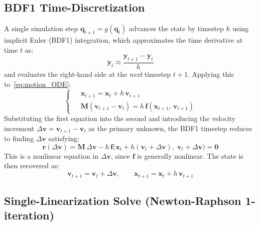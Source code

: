 \documentclass{article}
\begin{document}
\subsection{BDF1 Time-Discretization}

A single simulation step $\mathbf{q}_{t+1} = g(\mathbf{q}_t)$ advances the state by timestep $h$ using implicit Euler (BDF1) integration, which approximates the time derivative at time $t$ as:
\begin{equation*}
    \dot{\mathbf{y}}_t \approx \frac{\mathbf{y}_{t+1} - \mathbf{y}_t}{h}
\end{equation*}
and evaluates the right-hand side at the \emph{next} timestep $t+1$. Applying this to~\eqref{eq:motion_ODE}:
\begin{equation}
\label{eq:bdf1_system}
    \left\{
    \begin{aligned}
        & \; \mathbf{x}_{t+1} = \mathbf{x}_t + h\,\mathbf{v}_{t+1} \\[1ex]
        & \; \mathbf{M}(\mathbf{v}_{t+1} - \mathbf{v}_t) = h\,\mathbf{f}(\mathbf{x}_{t+1},\, \mathbf{v}_{t+1})
    \end{aligned}
    \right.
\end{equation}
Substituting the first equation into the second and introducing the velocity increment $\Delta\mathbf{v} = \mathbf{v}_{t+1} - \mathbf{v}_t$ as the primary unknown, the BDF1 timestep reduces to finding $\Delta\mathbf{v}$ satisfying:
\begin{equation}
\label{eq:bdf1_residual}
    \mathbf{r}(\Delta\mathbf{v}) = \mathbf{M}\,\Delta\mathbf{v} - h\,\mathbf{f}\!\bigl(\mathbf{x}_t + h(\mathbf{v}_t + \Delta\mathbf{v}),\;\mathbf{v}_t + \Delta\mathbf{v}\bigr) = \mathbf{0}
\end{equation}
This is a nonlinear equation in $\Delta\mathbf{v}$, since $\mathbf{f}$ is generally nonlinear. The state is then recovered as:
\begin{equation*}
    \mathbf{v}_{t+1} = \mathbf{v}_t + \Delta\mathbf{v}, \qquad \mathbf{x}_{t+1} = \mathbf{x}_t + h\,\mathbf{v}_{t+1}
\end{equation*}

\subsection{Single-Linearization Solve (Newton-Raphson 1-iteration)}
\end{document}
